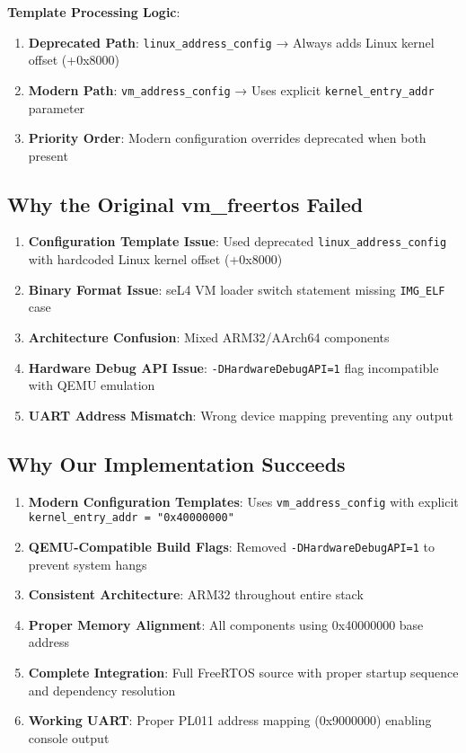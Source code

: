 \documentclass[12pt]{article}
\begin{document}
\textbf{Template Processing Logic}:
\begin{enumerate}
\item \textbf{Deprecated Path}: \texttt{linux\_address\_config} → Always adds Linux kernel offset (+0x8000)
\item \textbf{Modern Path}: \texttt{vm\_address\_config} → Uses explicit \texttt{kernel\_entry\_addr} parameter
\item \textbf{Priority Order}: Modern configuration overrides deprecated when both present
\end{enumerate}

\subsection{Why the Original vm\_freertos Failed}

\begin{enumerate}
\item \textbf{Configuration Template Issue}: Used deprecated \texttt{linux\_address\_config} with hardcoded Linux kernel offset (+0x8000)
\item \textbf{Binary Format Issue}: seL4 VM loader switch statement missing \texttt{IMG\_ELF} case
\item \textbf{Architecture Confusion}: Mixed ARM32/AArch64 components
\item \textbf{Hardware Debug API Issue}: \texttt{-DHardwareDebugAPI=1} flag incompatible with QEMU emulation
\item \textbf{UART Address Mismatch}: Wrong device mapping preventing any output
\end{enumerate}

\subsection{Why Our Implementation Succeeds}

\begin{enumerate}
\item \textbf{Modern Configuration Templates}: Uses \texttt{vm\_address\_config} with explicit \texttt{kernel\_entry\_addr = "0x40000000"}
\item \textbf{QEMU-Compatible Build Flags}: Removed \texttt{-DHardwareDebugAPI=1} to prevent system hangs
\item \textbf{Consistent Architecture}: ARM32 throughout entire stack
\item \textbf{Proper Memory Alignment}: All components using 0x40000000 base address
\item \textbf{Complete Integration}: Full FreeRTOS source with proper startup sequence and dependency resolution
\item \textbf{Working UART}: Proper PL011 address mapping (0x9000000) enabling console output
\end{enumerate}
\end{document}
